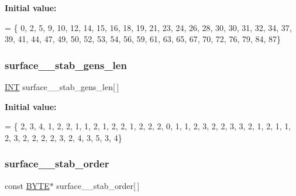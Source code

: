 {\bfseries Initial value\+:}
\begin{DoxyCode}
= \{ 0, 2, 5, 9, 10, 12, 14, 15, 16, 18, 
    19, 21, 23, 24, 26, 28, 30, 30, 31, 32, 
    34, 37, 39, 41, 44, 47, 49, 50, 52, 53, 
    54, 56, 59, 61, 63, 65, 67, 70, 72, 76, 
    79, 84, 87\}
\end{DoxyCode}
\mbox{\label{surface__31_8_c_af19eb1ee37ca52491084520bbaec34ab}} 
\subsubsection{\texorpdfstring{surface\+\_\+\_\+stab\+\_\+gens\+\_\+len}{surface\_31\_stab\_gens\_len}}
{\footnotesize\ttfamily \mbox{\hyperlink{galois_8h_a09fddde158a3a20bd2dcadb609de11dc}{I\+NT}} surface\+\_\+\_\+stab\+\_\+gens\+\_\+len\mbox{[}$\,$\mbox{]}}

{\bfseries Initial value\+:}
\begin{DoxyCode}
= \{ 2, 3, 4, 1, 2, 2, 1, 1, 2, 1, 
    2, 2, 1, 2, 2, 2, 0, 1, 1, 2, 
    3, 2, 2, 3, 3, 2, 1, 2, 1, 1, 
    2, 3, 2, 2, 2, 2, 3, 2, 4, 3, 
    5, 3, 4\}
\end{DoxyCode}
\mbox{\label{surface__31_8_c_a0657293ce166bab01bfee224a8e62e2e}} 
\subsubsection{\texorpdfstring{surface\+\_\+\_\+stab\+\_\+order}{surface\_31\_stab\_order}}
{\footnotesize\ttfamily const \mbox{\hyperlink{galois_8h_ab6cc7b4aeb6ea31aba2b3fbfc83ff5e6}{B\+Y\+TE}}$\ast$ surface\+\_\+\_\+stab\+\_\+order\mbox{[}$\,$\mbox{]}}

